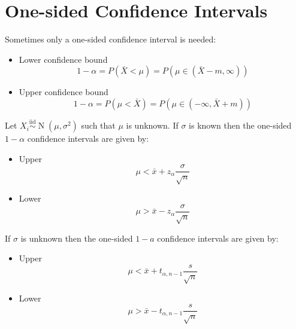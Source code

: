 \documentclass[letterpaper,12pt,fleqn]{article}
\renewcommand{\a}{\alpha}
\newcommand{\m}{\mu}
\renewcommand{\o}{\sigma}
\newcommand{\iid}{\overset{\text{iid}}{\sim}}
\DeclareMathOperator{\nd}{N}
\begin{document}
\section*{One-sided Confidence Intervals}

Sometimes only a one-sided confidence interval is needed:
\begin{itemize}
\item Lower confidence bound
  \[1-\a=P(\bar{X}<\m)=P\left(\m\in(\bar{X}-m,\infty)\right)\]
  \begin{quote}
  \end{quote}

\item Upper confidence bound
  \[1-\a=P(\m<\bar{X})=P\left(\m\in(-\infty,\bar{X}+m)\right)\]
  \begin{quote}
  \end{quote}
\end{itemize}

\begin{theorem}
  Let \(X_i\iid\nd(\m,\o^2)\) such that \(\m\) is unknown.  If \(\o\) is known then the one-sided \(1-\a\) confidence
  intervals are given by:
  \begin{itemize}
  \item Upper
    \[\m<\bar{x}+z_{\a}\frac{\o}{\sqrt{n}}\]
  \item Lower
    \[\m>\bar{x}-z_{\a}\frac{\o}{\sqrt{n}}\]
  \end{itemize}
  If \(\o\) is unknown then the one-sided \(1-a\) confidence intervals are given by:
  \begin{itemize}
  \item Upper
    \[\m<\bar{x}+t_{\a,n-1}\frac{s}{\sqrt{n}}\]
  \item Lower
    \[\m>\bar{x}-t_{\a,n-1}\frac{s}{\sqrt{n}}\]
  \end{itemize}
\end{theorem}
\end{document}

